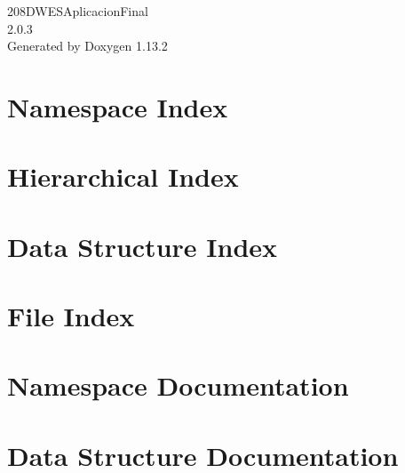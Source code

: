 \documentclass[twoside]{book}
\newcommand{\+}{\discretionary{\mbox{\scriptsize$\hookleftarrow$}}{}{}}
\newcommand{\clearemptydoublepage}{%
    \newpage{\pagestyle{empty}\cleardoublepage}%
  }
\begin{document}
  \raggedbottom
    \hypersetup{pageanchor=false,
                bookmarksnumbered=true,
                pdfencoding=unicode
               }
  \begin{titlepage}
  \vspace*{7cm}
  \begin{center}%
  {\Large 208\+DWESAplicacion\+Final}\\
  [1ex]\large 2.\+0.\+3 \\
  \vspace*{1cm}
  {\large Generated by Doxygen 1.13.2}\\
  \end{center}
  \end{titlepage}
  \clearemptydoublepage
  \tableofcontents
  \clearemptydoublepage
  \hypersetup{pageanchor=true}

\chapter{Namespace Index}

\chapter{Hierarchical Index}

\chapter{Data Structure Index}

\chapter{File Index}

\chapter{Namespace Documentation}

\chapter{Data Structure Documentation}











\end{document}
